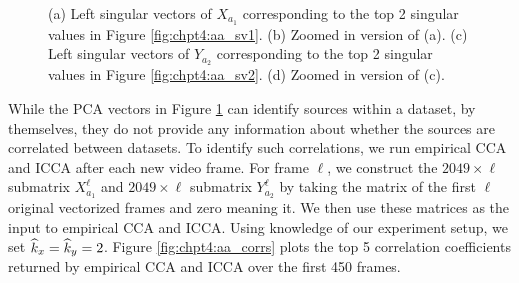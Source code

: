 \begin{figure}
\begin{center}
{    }   
    \caption{(a) Left singular vectors of $X_{a_1}$ corresponding to the top 2 singular
      values in Figure \ref{fig:chpt4:aa_sv1}. (b) Zoomed in version of (a). (c) Left
      singular vectors of $Y_{a_2}$ corresponding to the top 2 singular values in Figure
      \ref{fig:chpt4:aa_sv2}. (d) Zoomed in version of (c).}
    \label{fig:chpt4:aa_pca}
  \end{center}
\end{figure}


While the PCA vectors in Figure \ref{fig:chpt4:aa_pca} can identify sources within a
dataset, by themselves, they do not provide any information about whether the sources are
correlated between datasets. To identify such correlations, we run empirical CCA and ICCA
after each 
new video frame. For frame $\ell$, we construct the $2049\times\ell$ submatrix
$X_{a_1}^\ell$ and $2049\times\ell$ submatrix $Y_{a_2}^\ell$ by taking the matrix of the
first $\ell$ original vectorized frames and zero meaning it. We then use these matrices as
the input to empirical CCA and ICCA. Using knowledge of our experiment setup, we set
$\widehat{k}_x=\widehat{k}_y=2$. Figure \ref{fig:chpt4:aa_corrs} plots the top 5 correlation
coefficients returned by empirical CCA and ICCA over the first 450 frames.
